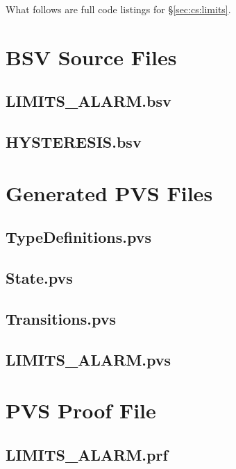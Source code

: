 What follows are full code listings for \S \ref{sec:cs:limits}.  

\section{BSV Source Files} \label{app:limits:bsv}
\subsection{LIMITS\_ALARM.bsv} \label{app:limits:bsv:limits}


\subsection{HYSTERESIS.bsv} \label{app:limits:bsv:hyst}


\section{Generated PVS Files} \label{app:limits:pvsgen}
\subsection{TypeDefinitions.pvs} \label{app:limits:pvsgen:td}


\subsection{State.pvs} \label{app:limits:pvsgen:state}


\subsection{Transitions.pvs} \label{app:limits:pvsgen:trans}


\subsection{LIMITS\_ALARM.pvs} \label{app:limits:pvsgen:top}


\section{PVS Proof File} \label{app:limits:prf}
\subsection{LIMITS\_ALARM.prf} \label{app:limits:prf:limits}
